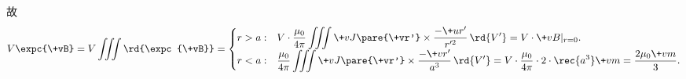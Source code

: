 \documentclass[hidelinks]{ctexart}
\begin{document}
故
\[ V\expc{\+vB} = V\iiint \rd{\expc{\+vB}} = \begin{cases}
    \displaystyle r>a: & \displaystyle V\cdot \frac{\mu_0}{4\pi} \iiint \+vJ\pare{\+vr'}\times \frac{-\+ur'}{r'^2}\,\rd{V'} = V\cdot \+vB\vert_{r=0}. \\
    \displaystyle r<a: & \displaystyle \frac{\mu_0}{4\pi} \iiint \+vJ\pare{\+vr'}\times \frac{-\+vr'}{a^3}\,\rd{V'} = V\cdot \frac{\mu_0}{4\pi} \cdot 2\cdot \rec{a^3} \+vm = \frac{2\mu_0 \+vm}{3}.
\end{cases} \]
\end{document}
